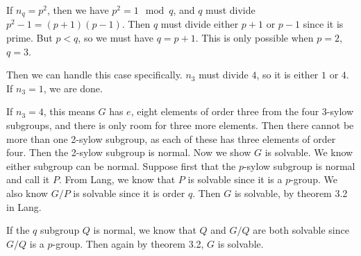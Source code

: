 \documentclass[11pt, reqno]{article}
\theoremstyle{plain}
\theoremstyle{definition}
\theoremstyle{remark}
\begin{document}
\begin{enumerate}
    If $n_q = p^2$, then we have $p^2 = 1 \mod q$, and $q$ must divide $p^2 - 1 = (p+1)(p-1)$. Then $q$ must divide either
    $p+1$ or $p-1$ since it is prime. But $p < q$, so we must have $q = p + 1$. This is only possible when $p = 2$, $q = 3$.

    Then we can handle this case specifically. $n_3$ must divide $4$, so it is either $1$ or $4$. If $n_3 = 1$, we are done.
    
    If $n_3 = 4$, this means $G$ has $e$, eight elements of order three from the four 3-sylow subgroups,
    and there is only room for three more elements. Then there cannot be more than one 2-sylow subgroup, as each of these
    has three elements of order four. Then the 2-sylow subgroup is normal.
    \bigbreak
    Now we show $G$ is solvable. We know either subgroup can be normal. Suppose first that the $p$-sylow subgroup is normal
    and call it $P$. From Lang, we know that $P$ is solvable since it is a $p$-group. We also know $G/P$ is solvable since 
    it is order $q$. Then $G$ is solvable, by theorem 3.2 in Lang.

    If the $q$ subgroup $Q$ is normal, we know that $Q$ and $G/Q$ are both solvable since $G/Q$ is a $p$-group. Then again 
    by theorem 3.2, $G$ is solvable. 

\end{enumerate}
\end{document}

